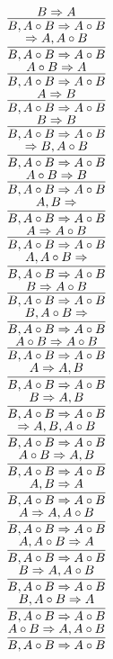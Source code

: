 \documentclass[11pt]{article}
\begin{document}
\begin{center}
\bigskip
\\$\infer{B, A\circ B\Rightarrow A\circ B}{B\Rightarrow A}$
\bigskip
\\$\infer{B, A\circ B\Rightarrow A\circ B}{\Rightarrow A, A\circ B}$
\bigskip
\\$\infer{B, A\circ B\Rightarrow A\circ B}{A\circ B\Rightarrow A}$
\bigskip
\\$\infer{B, A\circ B\Rightarrow A\circ B}{A\Rightarrow B}$
\bigskip
\\$\infer{B, A\circ B\Rightarrow A\circ B}{B\Rightarrow B}$
\bigskip
\\$\infer{B, A\circ B\Rightarrow A\circ B}{\Rightarrow B, A\circ B}$
\bigskip
\\$\infer{B, A\circ B\Rightarrow A\circ B}{A\circ B\Rightarrow B}$
\bigskip
\\$\infer{B, A\circ B\Rightarrow A\circ B}{A, B\Rightarrow }$
\bigskip
\\$\infer{B, A\circ B\Rightarrow A\circ B}{A\Rightarrow A\circ B}$
\bigskip
\\$\infer{B, A\circ B\Rightarrow A\circ B}{A, A\circ B\Rightarrow }$
\bigskip
\\$\infer{B, A\circ B\Rightarrow A\circ B}{B\Rightarrow A\circ B}$
\bigskip
\\$\infer{B, A\circ B\Rightarrow A\circ B}{B, A\circ B\Rightarrow }$
\bigskip
\\$\infer{B, A\circ B\Rightarrow A\circ B}{A\circ B\Rightarrow A\circ B}$
\bigskip
\\$\infer{B, A\circ B\Rightarrow A\circ B}{A\Rightarrow A, B}$
\bigskip
\\$\infer{B, A\circ B\Rightarrow A\circ B}{B\Rightarrow A, B}$
\bigskip
\\$\infer{B, A\circ B\Rightarrow A\circ B}{\Rightarrow A, B, A\circ B}$
\bigskip
\\$\infer{B, A\circ B\Rightarrow A\circ B}{A\circ B\Rightarrow A, B}$
\bigskip
\\$\infer{B, A\circ B\Rightarrow A\circ B}{A, B\Rightarrow A}$
\bigskip
\\$\infer{B, A\circ B\Rightarrow A\circ B}{A\Rightarrow A, A\circ B}$
\bigskip
\\$\infer{B, A\circ B\Rightarrow A\circ B}{A, A\circ B\Rightarrow A}$
\bigskip
\\$\infer{B, A\circ B\Rightarrow A\circ B}{B\Rightarrow A, A\circ B}$
\bigskip
\\$\infer{B, A\circ B\Rightarrow A\circ B}{B, A\circ B\Rightarrow A}$
\bigskip
\\$\infer{B, A\circ B\Rightarrow A\circ B}{A\circ B\Rightarrow A, A\circ B}$

\end{center}
\end{document}
